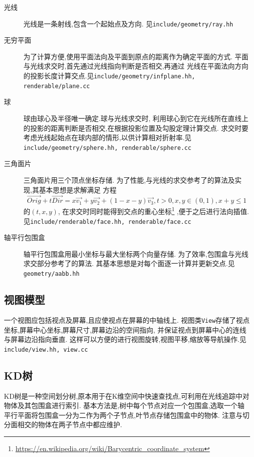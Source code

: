 \begin{description}
  \item[光线]光线是一条射线,包含一个起始点及方向. 见\verb|include/geometry/ray.hh|
  \item[无穷平面]
    为了计算方便,使用平面法向及平面到原点的距离作为确定平面的方式.
    平面与光线求交时,首先通过光线指向判断是否相交,再通过
    光线在平面法向方向的投影长度计算交点.见\verb|include/geometry/infplane.hh, renderable/plane.cc|

  \item[球]球由球心及半径唯一确定.球与光线求交时,
    利用球心到它在光线所在直线上的投影的距离判断是否相交,在根据投影位置及勾股定理计算交点.
    求交时要考虑光线起始点在球内部的情形,以供计算相对折射率.见\verb|include/geometry/sphere.hh, renderable/sphere.cc|

  \item[三角面片]三角面片用三个顶点坐标存储.
    为了性能,与光线的求交参考了\cite{triangle, triangle_code}的算法及实现,其基本思想是求解满足
    方程
    \[  \overrightarrow{Orig} + t  \overrightarrow{Dir} = x \overrightarrow{v_1} + y  \overrightarrow{v_2} + (1 - x -
      y)\overrightarrow{v_3}, t > 0, x, y \in (0, 1), x + y \le 1\]
    的$ (t, x, y)$, 在求交时同时能得到交点的重心坐标\footnote{\url{https://en.wikipedia.org/wiki/Barycentric\_coordinate\_system}}
    ,便于之后进行法向插值.见\verb|include/renderable/face.hh, renderable/face.cc|

  \item[轴平行包围盒]
    轴平行包围盒用最小坐标与最大坐标两个向量存储.
    为了效率,包围盒与光线求交部分参考了\cite{aabb}的算法.
    其基本思想是对每个面逐一计算并更新交点.见\verb|geometry/aabb.hh|
\end{description}


\subsection{视图模型}
一个视图应包括视点及屏幕,且应使视点在屏幕的中轴线上.
视图类\verb|View|存储了视点坐标,屏幕中心坐标,屏幕尺寸,屏幕边沿的空间指向,
并保证视点到屏幕中心的连线与屏幕边沿指向垂直.
这样可以方便的进行视图旋转,视图平移,缩放等导航操作.见\verb|include/view.hh, view.cc|

\subsection{KD树}
KD树是一种空间划分树,原本用于在K维空间中快速查找点,可利用在光线追踪中对物体及其包围盒进行索引.
基本方法是,树中每个节点对应一个包围盒,选取一个轴平行平面将包围盒一分为二作为两个子节点,叶节点存储包围盒中的物体.
注意与切分面相交的物体在两子节点中都应维护.

